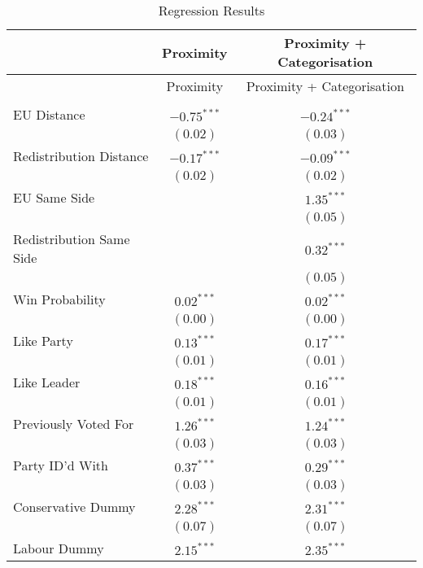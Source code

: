 
\begin{center}
\begin{longtable}[H]{l c c}
\caption{Regression Results}
\label{table:coefficients}\\
\hline
 & Proximity & Proximity + Categorisation \\
\hline
\endfirsthead
\hline
 & Proximity & Proximity + Categorisation \\
\hline
\endhead
\hline
\endfoot
\hline
\multicolumn{3}{l}{\scriptsize{$^{***}p<0.001$; $^{**}p<0.01$; $^{*}p<0.05$}}\\
\endlastfoot
EU Distance              & $-0.75^{***}$ & $-0.24^{***}$ \\
                         & $(0.02)$      & $(0.03)$      \\
Redistribution Distance  & $-0.17^{***}$ & $-0.09^{***}$ \\
                         & $(0.02)$      & $(0.02)$      \\
EU Same Side             &               & $1.35^{***}$  \\
                         &               & $(0.05)$      \\
Redistribution Same Side &               & $0.32^{***}$  \\
                         &               & $(0.05)$      \\
Win Probability          & $0.02^{***}$  & $0.02^{***}$  \\
                         & $(0.00)$      & $(0.00)$      \\
Like Party               & $0.13^{***}$  & $0.17^{***}$  \\
                         & $(0.01)$      & $(0.01)$      \\
Like Leader              & $0.18^{***}$  & $0.16^{***}$  \\
                         & $(0.01)$      & $(0.01)$      \\
Previously Voted For     & $1.26^{***}$  & $1.24^{***}$  \\
                         & $(0.03)$      & $(0.03)$      \\
Party ID'd With          & $0.37^{***}$  & $0.29^{***}$  \\
                         & $(0.03)$      & $(0.03)$      \\
Conservative Dummy       & $2.28^{***}$  & $2.31^{***}$  \\
                         & $(0.07)$      & $(0.07)$      \\
Labour Dummy             & $2.15^{***}$  & $2.35^{***}$  \\

\end{longtable}
\end{center}
